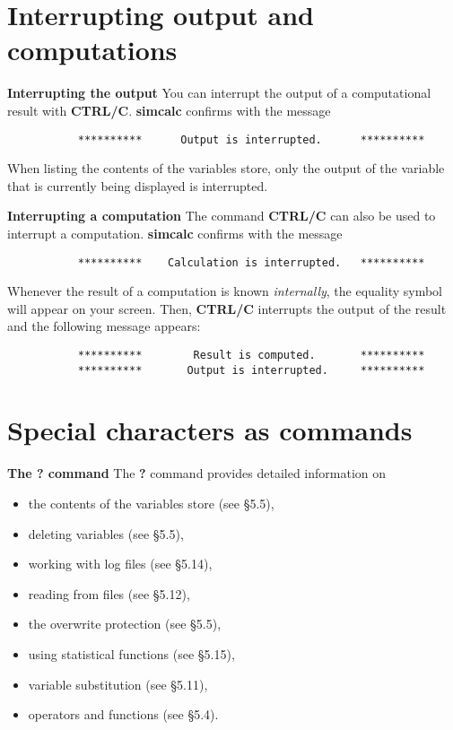 
\section{Interrupting output and computations}
{\bf Interrupting the output}
\leer
You can interrupt the output of a computational result with {\bf CTRL/C}. {\bf simcalc} confirms
with the message
\begin{verbatim}
           **********      Output is interrupted.      **********
\end{verbatim}
When listing the contents of the variables store, only the output of the variable that is
currently being displayed is interrupted.

\newpage

{\bf Interrupting a computation}
\leer
The command {\bf CTRL/C} can also be used to interrupt a computation. {\bf simcalc} confirms
with the message
\begin{verbatim}
           **********    Calculation is interrupted.   **********
\end{verbatim}
Whenever the result of a computation is known {\em internally\/}, the equality symbol will appear
on your screen. Then, {\bf CTRL/C} interrupts the output of the result and the following message
appears:
\begin{verbatim}
           **********        Result is computed.       **********
           **********       Output is interrupted.     **********
\end{verbatim}


\section{Special characters as commands}

{\bf The ? command}
\leer
The {\bf ?} command provides detailed information on
\begin{itemize}
\item  the contents of the variables store (see \S 5.5),
\item  deleting variables (see \S 5.5),
\item  working with log files (see \S 5.14),
\item  reading from files (see \S 5.12),
\item  the overwrite protection (see \S 5.5),
\item  using statistical functions (see \S 5.15),
\item  variable substitution (see \S 5.11),
\item  operators and functions (see \S 5.4).
\end{itemize}

